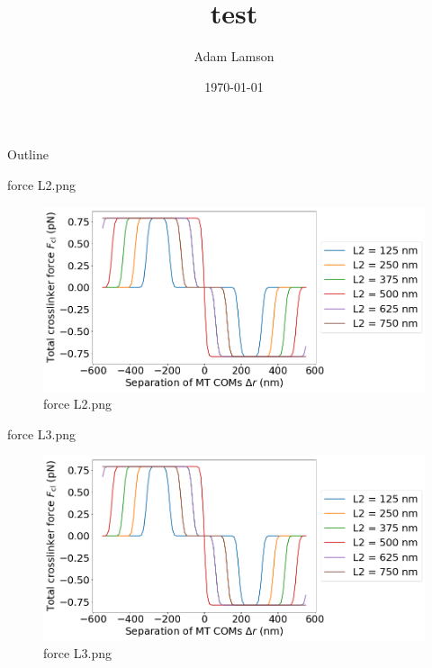 \documentclass{beamer}
\title[]{test}
\subtitle{}
\author{Adam Lamson}
\institute[CU Boulder]{University of Colorado Boulder}
\date[\today]{\today}
\begin{document}
\begin{frame}
\titlepage
\end{frame}

\begin{frame}[t]{Outline}
    \tableofcontents
\end{frame}

\begin{frame}[t]{force L2.png}
  \begin{figure}[htpb]
    \centering
    \includegraphics[width=0.8\linewidth]{force_L2.png}
    \caption{force L2.png}
    \label{fig:force_L2.png}
  \end{figure}
\end{frame}

\begin{frame}[t]{force L3.png}
  \begin{figure}[htpb]
    \centering
    \includegraphics[width=0.8\linewidth]{force_L3.png}
    \caption{force L3.png}
    \label{fig:force_L3.png}
  \end{figure}
\end{frame}
\end{document}
